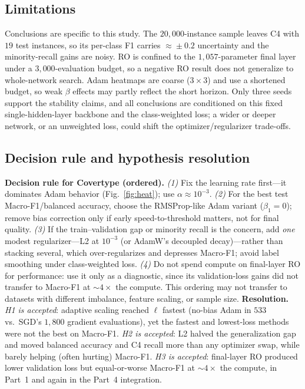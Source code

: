 \documentclass[letterpaper, 10pt, conference]{ieeeconf}
\begin{document}
\subsection{Limitations}
Conclusions are specific to this study. The $20{,}000$-instance sample leaves C4
with $19$ test instances, so its per-class F1 carries $\approx\!\pm0.2$
uncertainty and the minority-recall gains are noisy. RO is confined to the
$1{,}057$-parameter final layer under a $3{,}000$-evaluation budget, so a negative
RO result does not generalize to whole-network search. Adam heatmaps are coarse
($3{\times}3$) and use a shortened budget, so weak $\beta$ effects may partly
reflect the short horizon. Only three seeds support the stability claims, and all
conclusions are conditioned on this fixed single-hidden-layer backbone and the
class-weighted loss; a wider or deeper network, or an unweighted loss, could
shift the optimizer/regularizer trade-offs.

\subsection{Decision rule and hypothesis resolution}
\textbf{Decision rule for Covertype (ordered).} \emph{(1)} Fix the learning rate
first---it dominates Adam behavior (Fig.~\ref{fig:heat}); use $\alpha\!\approx\!10^{-3}$.
\emph{(2)} For the best test Macro-F1/balanced accuracy, choose the RMSProp-like
Adam variant ($\beta_1{=}0$); remove bias correction only if early
speed-to-threshold matters, not for final quality. \emph{(3)} If the
train--validation gap or minority recall is the concern, add \emph{one} modest
regularizer---L2 at $10^{-3}$ (or AdamW's decoupled decay)---rather than stacking
several, which over-regularizes and depresses Macro-F1; avoid label smoothing
under class-weighted loss. \emph{(4)} Do not spend compute on final-layer RO for
performance: use it only as a diagnostic, since its validation-loss gains did not
transfer to Macro-F1 at $\sim\!4\times$ the compute. This ordering may not
transfer to datasets with different imbalance, feature scaling, or sample size.
\textbf{Resolution.} \emph{H1 is accepted}: adaptive scaling reached $\ell$
fastest (no-bias Adam in $533$ vs.\ SGD's $1{,}800$ gradient evaluations), yet the
fastest and lowest-loss methods were not the best on Macro-F1. \emph{H2 is
accepted}: L2 halved the generalization gap and moved balanced accuracy and C4
recall more than any optimizer swap, while barely helping (often hurting)
Macro-F1. \emph{H3 is accepted}: final-layer RO produced lower validation loss but
equal-or-worse Macro-F1 at $\sim\!4\times$ the compute, in Part~1 and again in the
Part~4 integration.
\end{document}
